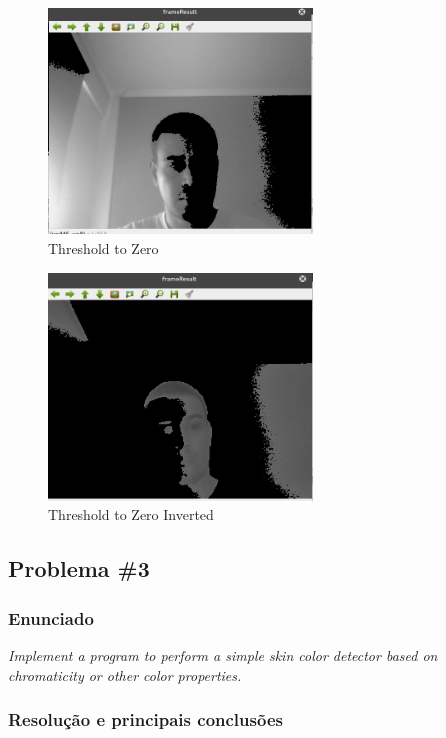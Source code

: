 \documentclass[portuguese, times, mirror]{revdetua}
\begin{document}
\begin{figure}[ht!]
\centering
\includegraphics[width=70mm]{img/2_4.png}
\caption{Threshold to Zero}
\end{figure}

\begin{figure}[ht!]
\centering
\includegraphics[width=70mm]{img/2_5.png}
\caption{Threshold to Zero Inverted}
\end{figure}







\newpage

\subsection{Problema \#3}

\subsubsection{Enunciado}
\textit{ Implement a program to perform a simple skin color detector based on chromaticity or other color
properties.}

\subsubsection{Resolução e principais conclusões}
\end{document}
